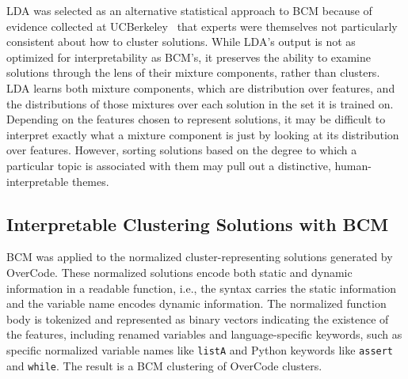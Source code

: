 LDA was selected as an alternative statistical approach to BCM because of evidence collected at UCBerkeley~\cite{} that experts were themselves not particularly consistent about how to cluster solutions. While LDA's output is not as optimized for interpretability as BCM's, it preserves the ability to examine solutions through the lens of their mixture components, rather than clusters. LDA learns both mixture components, which are distribution over features, and the distributions of those mixtures over each solution in the set it is trained on. Depending on the features chosen to represent solutions, it may be difficult to interpret exactly what a mixture component is just by looking at its distribution over features. However, sorting solutions based on the degree to which a particular topic is associated with them may pull out a distinctive, human-interpretable themes. %



\subsection{Interpretable Clustering Solutions with BCM}

BCM was applied to the normalized cluster-representing solutions generated by OverCode. These normalized solutions encode both static and dynamic information in a readable function, i.e., the syntax carries the static information and the variable name encodes dynamic information. The normalized function body is tokenized and represented as binary vectors indicating  the existence of the features, including renamed variables and language-specific keywords, such as specific normalized variable names like \texttt{listA} and Python keywords like \texttt{assert} and \texttt{while}. The result is a BCM clustering of OverCode clusters.

